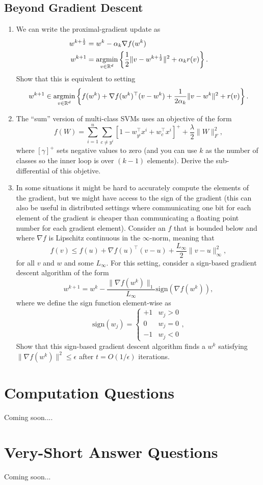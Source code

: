 \documentclass{article}
\def\blu#1{{\color{blu}#1}}
\def\red#1{{\color{red}#1}}
\def\norm#1{\|#1\|}
\def\R{\mathbb{R}}
\newcommand{\argmin}[1]{\mathop{\hbox{argmin}}_{#1}}
\def\half{\frac 1 2}
\def\enum#1{\begin{enumerate}#1\end{enumerate}}
\begin{document}
\subsection{Beyond Gradient Descent}


\enum{
\item We can write the proximal-gradient update as
\begin{align*}
w^{k+\half} & = w^k - \alpha_k \nabla f(w^k)\\
w^{k+1} &= \argmin{v\in\R^d}\left\{\frac{1}{2}\norm{v -w^{k+\half}}^2 + \alpha_kr(v)\right\}.
\end{align*}
\blu{Show that this is equivalent to setting
\[
w^{k+1} \in \argmin{v\in\R^d} \left\{ f(w^k) + \nabla f(w^k)^\top (v-w^k) + \frac{1}{2\alpha_k}\norm{v-w^k}^2  +r(v)\right\}.
\]
}
\item The ``sum'' version of multi-class SVMs uses an objective of the form
\[
f(W) = \sum_{i=1}^n \sum_{c \neq y^i}[1 - w_{y^i}^\top x^i + w_c^\top x^i]^+ + \frac \lambda 2 \norm{W}_F^2,
\]
where $[\gamma]^+$ sets negative values to zero (and you can use $k$ as the number of classes so the inner loop is over $(k-1)$ elements). \blu{Derive the sub-differential of this objetive}.
\item In some situations it might be hard to accurately compute the elements of the gradient, but we might have access to the sign of the gradient (this can also be useful in distributed settings where communicating one bit for each element of the gradient is cheaper than communicating a floating point number for each gradient element). 
Consider an $f$ that is bounded below and where $\nabla f$ is Lipschitz continuous in the $\infty$-norm, meaning that
\[
f(v) \leq f(u) + \nabla f(u)^\top (v-u) + \frac{L_\infty}{2}\norm{v-u}_\infty^2,
\]
for all $v$ and $w$ and some $L_\infty$. 
For this setting, consider a sign-based gradient descent algorithm of the form
\[
w^{k+1} = w^k - \frac{\norm{\nabla f(w^k)}_1}{L_\infty}\text{sign}(\nabla f(w^k)),
\]
where we define the sign function element-wise as
\[
\text{sign}(w_j) = \begin{cases}+1 & w_j > 0\\0 & w_j =0\\-1 & w_j < 0\end{cases},
\]
\blu{Show that this sign-based gradient descent algorithm finds a $w^k$ satisfying \red{$\norm{\nabla f(w^k)}^2 \leq \epsilon$} after $t = O(1/\epsilon)$ iterations.}
}


\section{Computation Questions}

Coming soon....





\section{Very-Short Answer Questions}

Coming soon...



 
\end{document}
